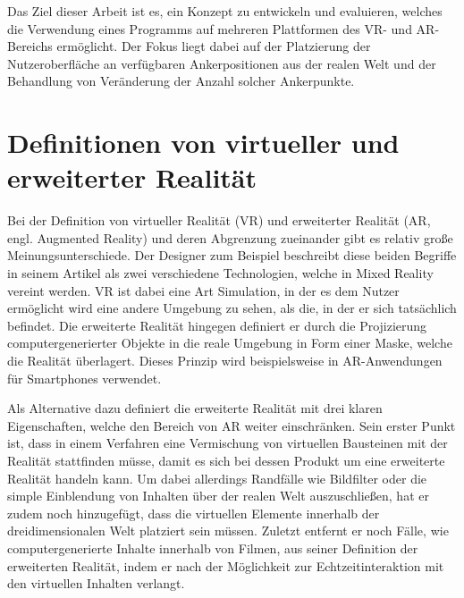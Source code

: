 	
	Das Ziel dieser Arbeit ist es, ein Konzept zu entwickeln und evaluieren, welches die Verwendung eines Programms auf mehreren Plattformen des VR- und AR-Bereichs ermöglicht. Der Fokus liegt dabei auf der Platzierung der Nutzeroberfläche an verfügbaren Ankerpositionen aus der realen Welt und der Behandlung von Veränderung der Anzahl solcher Ankerpunkte.
	
	\section{Definitionen von virtueller und erweiterter Realität}
	Bei der Definition von virtueller Realität (VR) und erweiterter Realität (AR, engl. Augmented Reality) und deren Abgrenzung zueinander gibt es relativ große Meinungsunterschiede. Der Designer  zum Beispiel beschreibt diese beiden Begriffe in seinem Artikel  als zwei verschiedene Technologien, welche in Mixed Reality vereint werden. VR ist dabei eine Art Simulation, in der es dem Nutzer ermöglicht wird eine andere Umgebung zu sehen, als die, in der er sich tatsächlich befindet. Die erweiterte Realität hingegen definiert er durch die Projizierung computergenerierter Objekte in die reale Umgebung in Form einer Maske, welche die Realität überlagert.
	Dieses Prinzip wird beispielsweise in AR-Anwendungen für Smartphones verwendet.\cite{tidjane}
	
	Als Alternative dazu definiert  die erweiterte Realität mit drei klaren Eigenschaften, welche den Bereich von AR weiter einschränken. Sein erster Punkt ist, dass in einem Verfahren eine Vermischung von virtuellen Bausteinen mit der Realität stattfinden müsse, damit es sich bei dessen Produkt um eine erweiterte Realität handeln kann. Um dabei allerdings Randfälle wie Bildfilter oder die simple Einblendung von Inhalten über der realen Welt auszuschließen, hat er zudem noch hinzugefügt, dass die virtuellen Elemente innerhalb der dreidimensionalen Welt platziert sein müssen. Zuletzt entfernt er noch Fälle, wie computergenerierte Inhalte innerhalb von Filmen, aus seiner Definition der erweiterten Realität, indem er nach der Möglichkeit zur Echtzeitinteraktion mit den virtuellen Inhalten verlangt.\cite{azuma}
	
	
	

